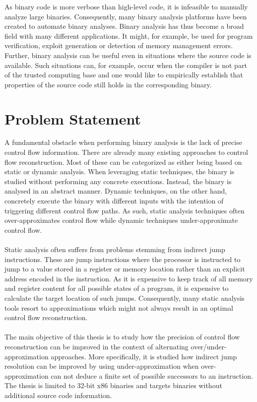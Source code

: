 \documentclass{kththesis}
\begin{document}
As binary code is more verbose than high-level code, it is infeasible to manually analyze large binaries. Consequently, many binary analysis platforms have been created to automate binary analyses\cite{BitBlaze}\cite{BAP}\cite{TrABin}\cite{CodeSurfer}. Binary analysis has thus become a broad field with many different applications. It might, for example, be used for program verification\cite{TrABin}, exploit generation\cite{angr} or detection of memory management errors\cite{valgrind}. Further, binary analysis can be useful even in situations where the source code is available. Such situations can, for example, occur when the compiler is not part of the trusted computing base and one would like to empirically establish that properties of the source code still holds in the corresponding binary.
\section{Problem Statement}
A fundamental obstacle when performing binary analysis is the lack of precise control flow information\cite{preciseCFGBoolean}. There are already many existing approaches to control flow reconstruction. Most of these can be categorized as either being based on static or dynamic analysis. When leveraging static techniques, the binary is studied without performing any concrete executions. Instead, the binary is analysed in an abstract manner. Dynamic techniques, on the other hand, concretely execute the binary with different inputs with the intention of triggering different control flow paths. As such, static analysis techniques often over-approximates control flow while dynamic techniques under-approximate control flow.
\\ \\ 
Static analysis often suffers from problems stemming from indirect jump instructions. These are jump instructions where the processor is instructed to jump to a value stored in a register or memory location rather than an explicit address encoded in the instruction. As it is expensive to keep track of all memory and register content for all possible states of a program, it is expensive to calculate the target location of such jumps. Consequently, many static analysis tools resort to approximations which might not always result in an optimal control flow reconstruction.
\\ \\
The main objective of this thesis is to study how the precision of control flow reconstruction can be improved in the context of alternating over/under-approximation approaches. More specifically, it is studied how indirect jump resolution can be improved by using under-approximation when over-approximation can not deduce a finite set of possible successors to an instruction. The thesis is limited to 32-bit x86 binaries and targets binaries without additional source code information.
\end{document}
